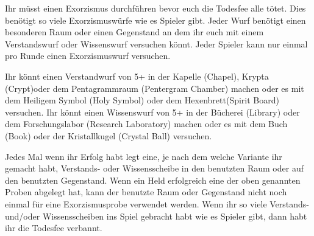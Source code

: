 





Ihr müsst einen Exorzismus durchführen bevor euch die Todesfee alle tötet. Dies benötigt so viele Exorzismuswürfe wie es Spieler gibt. Jeder Wurf benötigt einen besonderen Raum oder einen Gegenstand an dem ihr euch mit einem Verstandswurf oder Wissenswurf versuchen könnt. Jeder Spieler kann nur einmal pro Runde einen Exorzismuswurf versuchen.

  \begin{itemize}
        \bitem Ihr könnt einen Verstandwurf von 5+ in der Kapelle (Chapel), Krypta (Crypt)oder dem Pentagrammraum (Pentergram Chamber) machen oder es mit dem Heiligem Symbol (Holy Symbol) oder dem Hexenbrett(Spirit Board) versuchen.
        \bitem  Ihr könnt einen Wissenswurf von 5+ in der Bücherei (Library) oder dem Forschungslabor (Research Laboratory) machen oder es mit dem Buch (Book) oder der Kristallkugel (Crystal Ball) versuchen.
    \end{itemize}
\newpage
Jedes Mal wenn ihr Erfolg habt legt eine, je nach dem welche Variante ihr gemacht habt, Verstands- oder Wissensscheibe in den benutzten Raum oder auf den benutzten Gegenstand.
Wenn ein Held erfolgreich eine der oben genannten Proben abgelegt hat, kann der benutzte Raum oder Gegenstand nicht noch einmal für eine Exorzismusprobe verwendet werden.
Wenn ihr so viele Verstands- und/oder Wissensscheiben ins Spiel gebracht habt wie es Spieler gibt, dann habt ihr die Todesfee verbannt.

